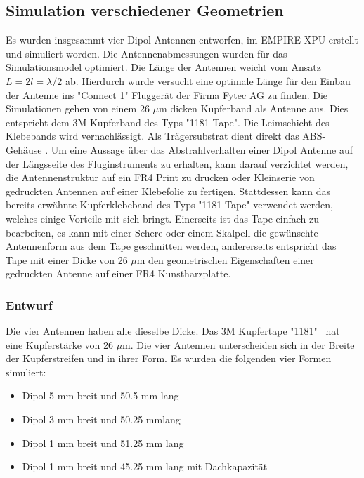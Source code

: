 \subsection{Simulation  verschiedener Geometrien}\label{sec:Sim_verschiedene_Geometrien}
Es wurden insgesammt vier Dipol Antennen entworfen, im EMPIRE XPU erstellt und simuliert worden. Die Antennenabmessungen wurden für das Simulationsmodel optimiert. Die Länge der Antennen weicht vom Ansatz $L=2l=\lambda/2$ ab. Hierdurch wurde versucht eine optimale Länge für den Einbau der Antenne ins "Connect 1" Fluggerät der Firma Fytec AG zu finden. Die Simulationen gehen von einem 26 $\mu$m dicken Kupferband als Antenne aus. Dies entspricht dem 3M Kupferband des Typs "1181 Tape". Die Leimschicht des Klebebands wird vernachlässigt. Als Trägersubstrat dient direkt das ABS-Gehäuse \cite{Kupferband}. 
Um eine Aussage über das Abstrahlverhalten einer Dipol Antenne auf der Längsseite des Fluginstruments zu erhalten, kann darauf verzichtet werden, die Antennenstruktur auf ein FR4 Print zu drucken oder Kleinserie von gedruckten Antennen auf einer Klebefolie zu fertigen. Stattdessen kann das bereits erwähnte Kupferklebeband des Typs "1181 Tape" verwendet werden, welches einige Vorteile mit sich bringt.
Einerseits ist das Tape einfach zu bearbeiten, es kann mit einer Schere oder einem Skalpell die gewünschte Antennenform aus dem Tape geschnitten werden, andererseits entspricht das Tape mit einer Dicke von 26 $\mu$m  den geometrischen Eigenschaften einer gedruckten Antenne auf einer FR4 Kunstharzplatte.

\newpage
\subsubsection*{Entwurf}
Die vier Antennen haben alle dieselbe Dicke. Das 3M Kupfertape "1181" \  hat eine Kupferstärke von 26 $\mu$m. Die vier Antennen unterscheiden sich in der Breite der Kupferstreifen und in ihrer Form. Es wurden die folgenden vier Formen simuliert:
\begin{itemize}
\item Dipol 5 mm breit und 50.5 mm lang
\item Dipol 3 mm breit und 50.25 mmlang
\item Dipol 1 mm breit und 51.25 mm lang
\item Dipol 1 mm breit und 45.25 mm lang mit Dachkapazität
\end{itemize}

